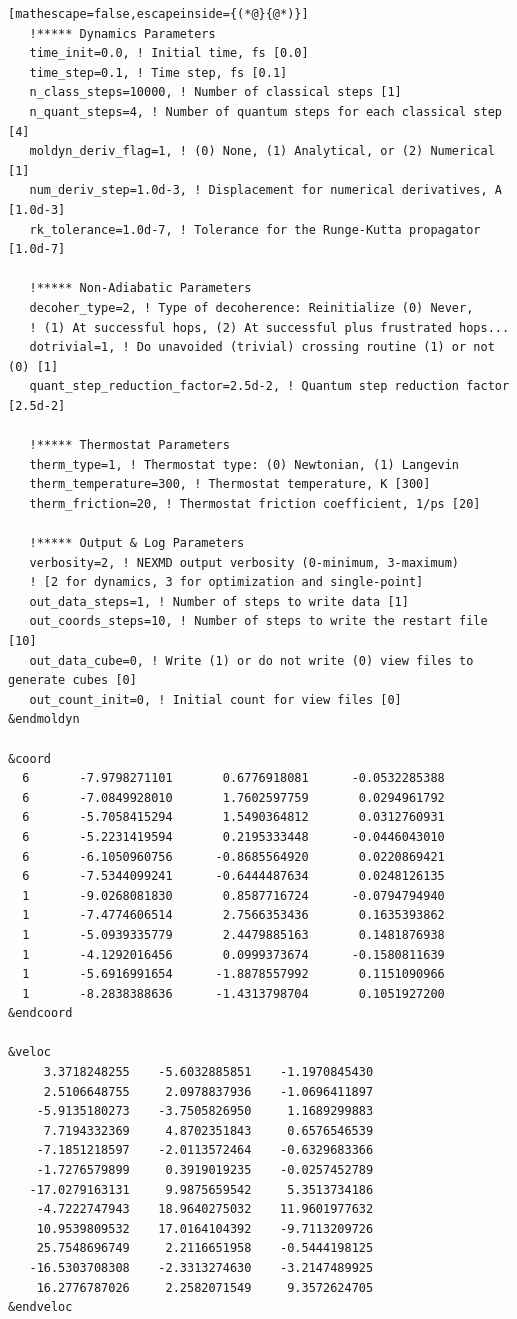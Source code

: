 \documentclass[letterpaper,12pt,titlepage]{article}
\begin{document}
\begin{appendix}
\begin{lstlisting}[mathescape=false,escapeinside={(*@}{@*)}]
   !***** Dynamics Parameters
   time_init=0.0, ! Initial time, fs [0.0]
   time_step=0.1, ! Time step, fs [0.1]
   n_class_steps=10000, ! Number of classical steps [1]
   n_quant_steps=4, ! Number of quantum steps for each classical step [4]
   moldyn_deriv_flag=1, ! (0) None, (1) Analytical, or (2) Numerical [1]
   num_deriv_step=1.0d-3, ! Displacement for numerical derivatives, A [1.0d-3]
   rk_tolerance=1.0d-7, ! Tolerance for the Runge-Kutta propagator [1.0d-7]

   !***** Non-Adiabatic Parameters
   decoher_type=2, ! Type of decoherence: Reinitialize (0) Never, 
   ! (1) At successful hops, (2) At successful plus frustrated hops... 
   dotrivial=1, ! Do unavoided (trivial) crossing routine (1) or not (0) [1]
   quant_step_reduction_factor=2.5d-2, ! Quantum step reduction factor [2.5d-2]

   !***** Thermostat Parameters
   therm_type=1, ! Thermostat type: (0) Newtonian, (1) Langevin
   therm_temperature=300, ! Thermostat temperature, K [300]
   therm_friction=20, ! Thermostat friction coefficient, 1/ps [20]

   !***** Output & Log Parameters
   verbosity=2, ! NEXMD output verbosity (0-minimum, 3-maximum)
   ! [2 for dynamics, 3 for optimization and single-point]
   out_data_steps=1, ! Number of steps to write data [1]
   out_coords_steps=10, ! Number of steps to write the restart file [10]
   out_data_cube=0, ! Write (1) or do not write (0) view files to generate cubes [0]
   out_count_init=0, ! Initial count for view files [0]
&endmoldyn

&coord
  6       -7.9798271101       0.6776918081      -0.0532285388
  6       -7.0849928010       1.7602597759       0.0294961792
  6       -5.7058415294       1.5490364812       0.0312760931
  6       -5.2231419594       0.2195333448      -0.0446043010
  6       -6.1050960756      -0.8685564920       0.0220869421
  6       -7.5344099241      -0.6444487634       0.0248126135
  1       -9.0268081830       0.8587716724      -0.0794794940
  1       -7.4774606514       2.7566353436       0.1635393862
  1       -5.0939335779       2.4479885163       0.1481876938
  1       -4.1292016456       0.0999373674      -0.1580811639
  1       -5.6916991654      -1.8878557992       0.1151090966
  1       -8.2838388636      -1.4313798704       0.1051927200
&endcoord

&veloc
     3.3718248255    -5.6032885851    -1.1970845430
     2.5106648755     2.0978837936    -1.0696411897
    -5.9135180273    -3.7505826950     1.1689299883
     7.7194332369     4.8702351843     0.6576546539
    -7.1851218597    -2.0113572464    -0.6329683366
    -1.7276579899     0.3919019235    -0.0257452789
   -17.0279163131     9.9875659542     5.3513734186
    -4.7222747943    18.9640275032    11.9601977632
    10.9539809532    17.0164104392    -9.7113209726
    25.7548696749     2.2116651958    -0.5444198125
   -16.5303708308    -2.3313274630    -3.2147489925
    16.2776787026     2.2582071549     9.3572624705
&endveloc


\end{lstlisting}
\end{appendix}
\end{document}
